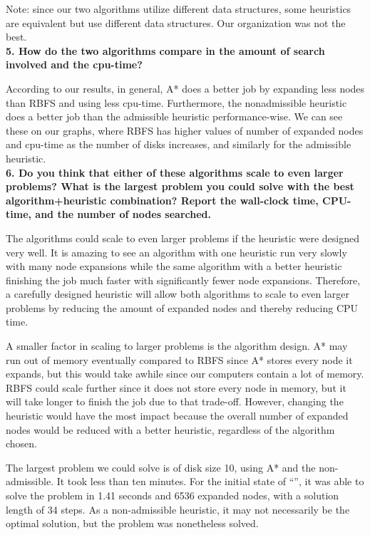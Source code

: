 Note: since our two algorithms utilize different data structures, some heuristics are equivalent but use different data structures. Our organization was not the best.\\

\textbf{5. How do the two algorithms compare in the amount of search involved and the cpu-time?}

According to our results, in general, A* does a better job by expanding less nodes than RBFS and using less cpu-time. Furthermore, the nonadmissible heuristic does a better job than the admissible heuristic performance-wise. We can see these on our graphs, where RBFS has higher values of number of expanded nodes and cpu-time as the number of disks increases, and similarly for the admissible heuristic.\\

\textbf{6. Do you think that either of these algorithms scale to even larger problems? What is the largest problem you could solve with the best algorithm+heuristic combination? Report the wall-clock time, CPU-time, and the number of nodes searched.}

The algorithms could scale to even larger problems if the heuristic were designed very well. It is amazing to see an algorithm with one heuristic run very slowly with many node expansions while the same algorithm with a better heuristic finishing the job much faster with significantly fewer node expansions. Therefore, a carefully designed heuristic will allow both algorithms to scale to even larger problems by reducing the amount of expanded nodes and thereby reducing CPU time.

A smaller factor in scaling to larger problems is the algorithm design. A* may run out of memory eventually compared to RBFS since A* stores every node it expands, but this would take awhile since our computers contain a lot of memory. RBFS could scale further since it does not store every node in memory, but it will take longer to finish the job due to that trade-off. However, changing the heuristic would have the most impact because the overall number of expanded nodes would be reduced with a better heuristic, regardless of the algorithm chosen.

The largest problem we could solve is of disk size 10, using A* and the non-admissible. It took less than ten minutes. For the initial state of ``'', it was able to solve the problem in 1.41 seconds and 6536 expanded nodes, with a solution length of 34 steps. As a non-admissible heuristic, it may not necessarily be the optimal solution, but the problem was nonetheless solved.

